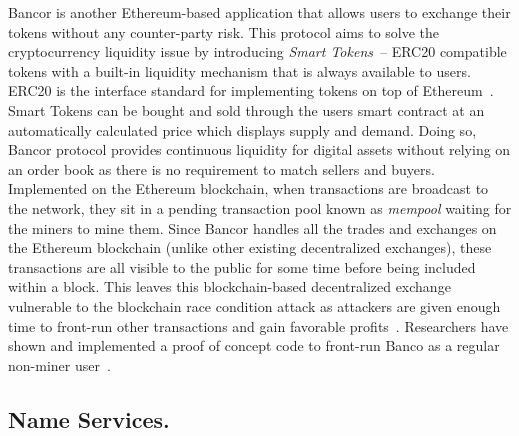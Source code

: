 Bancor is another Ethereum-based application that allows users to exchange their tokens without any counter-party risk. This protocol aims to solve the cryptocurrency liquidity issue by introducing \textit{Smart Tokens}~\cite{hertzog2017bancor}-- ERC20 compatible tokens with a built-in liquidity mechanism that is always available to users. ERC20 is the interface standard for implementing tokens on top of Ethereum~\cite{erc20}. Smart Tokens can be bought and sold through the users smart contract at an automatically calculated price which displays supply and demand. Doing so, Bancor protocol provides continuous liquidity for digital assets without relying on an order book as there is no requirement to match sellers and buyers.
Implemented on the Ethereum blockchain, when transactions are broadcast to the network, they sit in a pending transaction pool known as \textit{mempool} waiting for the miners to mine them. Since Bancor handles all the trades and exchanges on the Ethereum blockchain (unlike other existing decentralized exchanges), these transactions are all visible to the public for some time before being included within a block. This leaves this blockchain-based decentralized exchange vulnerable to the blockchain race condition attack as attackers are given enough time to front-run other transactions and gain favorable profits~\cite{BancorIs7:online}. Researchers have shown and implemented a proof of concept code to front-run Banco as a regular non-miner user~\cite{NewTab13:online}.

\subsection{Name Services.}\label{sec:ens}

